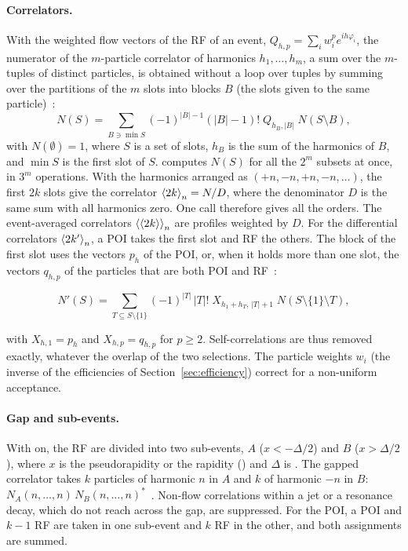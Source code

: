 \paragraph{Correlators.}
With the weighted flow vectors of the RF of an event, $Q_{h,p} = \sum_i w_i^p e^{ih\varphi_i}$, the numerator of the
$m$-particle correlator of harmonics $h_1,\dots,h_m$, a sum over the $m$-tuples of distinct particles, is obtained without
a loop over tuples by summing over the partitions of the $m$ slots into blocks $B$ (the slots given to the same
particle)~\cite{Bilandzic:2013kga}:
\begin{equation}
  N(S) = \sum_{B \ni \min S} (-1)^{|B|-1}(|B|-1)!\; Q_{h_B,|B|}\; N(S\setminus B),
\end{equation}
with $N(\emptyset) = 1$, where $S$ is a set of slots, $h_B$ is the sum of the harmonics of $B$, and $\min S$ is the first slot of $S$.
 computes $N(S)$ for all the $2^m$ subsets at once, in $3^m$ operations. With the harmonics
arranged as $(+n,-n,+n,-n,\dots)$, the first $2k$ slots give the correlator $\left\langle 2k \right\rangle_n = N/D$, where the denominator
$D$ is the same sum with all harmonics zero. One call therefore gives all the orders. The event-averaged correlators
$\left\langle \left\langle 2k \right\rangle \right\rangle_n$ are profiles weighted by $D$. For the differential correlators $\left\langle 2k' \right\rangle_n$, a POI takes the first
slot and RF the others. The block of the first slot uses the vectors $p_{h}$ of the POI, or, when it holds more than one
slot, the vectors $q_{h,p}$ of the particles that are both POI and RF~\cite{Bilandzic:2010jr}:
\begin{widetext}
\begin{equation}
  N'(S) = \sum_{T\subseteq S\setminus\{1\}} (-1)^{|T|}\,|T|!\; X_{h_1+h_T,\,|T|+1}\; N(S\setminus\{1\}\setminus T),
\end{equation}
\end{widetext}
with $X_{h,1} = p_h$ and $X_{h,p} = q_{h,p}$ for $p\ge 2$. Self-correlations are thus removed exactly, whatever the overlap
of the two selections. The particle weights $w_i$ (the inverse of the efficiencies of Section~\ref{sec:efficiency})
correct for a non-uniform acceptance.

\paragraph{Gap and sub-events.}
With  on, the RF are divided into two sub-events, $A$ ($x<-\Delta/2$) and $B$ ($x>\Delta/2$), where $x$ is the
pseudorapidity or the rapidity () and $\Delta$ is . The gapped correlator takes $k$
particles of harmonic $n$ in $A$ and $k$ of harmonic $-n$ in $B$:
$N_A(n,\dots,n)\,N_B(n,\dots,n)^*$~\cite{Jia:2017hbm}. Non-flow correlations within a jet or a resonance decay, which do
not reach across the gap, are suppressed. For the POI, a POI and $k-1$ RF are taken in one sub-event and $k$ RF in the
other, and both assignments are summed.

